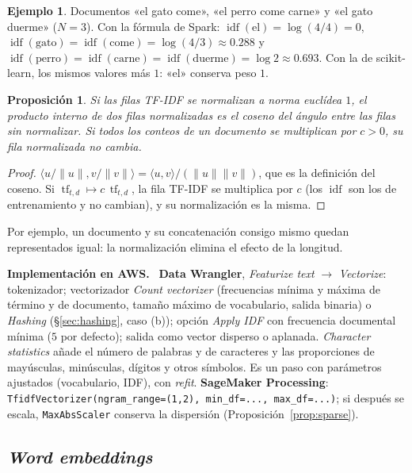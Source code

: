 \documentclass[11pt,a4paper]{article}
\theoremstyle{plain}
\newtheorem{proposicion}[teorema]{Proposición}
\theoremstyle{definition}
\newtheorem{ejemplo}[teorema]{Ejemplo}
\theoremstyle{remark}
\newcommand{\idf}{\operatorname{idf}}
\newcommand{\tf}{\operatorname{tf}}
\newcommand{\1}{\mathbf{1}}
\newenvironment{aws}{\par\medskip\sloppy\noindent\textbf{Implementación en AWS.}\ }{\par\medskip}
\begin{document}
\begin{ejemplo}
Documentos «el gato come», «el perro come carne» y «el gato duerme»
($N=3$). Con la fórmula de Spark: $\idf(\text{el})=\log(4/4)=0$,
$\idf(\text{gato})=\idf(\text{come})=\log(4/3)\approx0.288$ y
$\idf(\text{perro})=\idf(\text{carne})=\idf(\text{duerme})=\log2\approx0.693$.
Con la de scikit-learn, los mismos valores más $1$: «el» conserva peso $1$.
\end{ejemplo}

\begin{proposicion}\label{prop:coseno}
Si las filas TF-IDF se normalizan a norma euclídea $1$, el producto
interno de dos filas normalizadas es el coseno del ángulo entre las filas
sin normalizar. Si todos los conteos de un documento se multiplican por
$c>0$, su fila normalizada no cambia.
\end{proposicion}

\begin{proof}
$\langle u/\|u\|,v/\|v\|\rangle=\langle u,v\rangle/(\|u\|\|v\|)$, que es
la definición del coseno. Si $\tf_{t,d}\mapsto c\,\tf_{t,d}$, la fila
TF-IDF se multiplica por $c$ (los $\idf$ son los de entrenamiento y no
cambian), y su normalización es la misma.
\end{proof}

Por ejemplo, un documento y su concatenación consigo mismo quedan
representados igual: la normalización elimina el efecto de la longitud.

\begin{aws}
\textbf{Data Wrangler}, \emph{Featurize text} $\to$ \emph{Vectorize}:
tokenizador; vectorizador \emph{Count vectorizer} (frecuencias mínima y
máxima de término y de documento, tamaño máximo de vocabulario, salida
binaria) o \emph{Hashing} (\S\ref{sec:hashing}, caso (b)); opción
\emph{Apply IDF} con frecuencia documental mínima ($5$ por defecto); salida
como vector disperso o aplanada. \emph{Character statistics} añade el
número de palabras y de caracteres y las proporciones de mayúsculas,
minúsculas, dígitos y otros símbolos. Es un paso con parámetros
ajustados (vocabulario, IDF), con \emph{refit}. \textbf{SageMaker
Processing}: \texttt{TfidfVectorizer(ngram\_range=(1,2), min\_df=...,
max\_df=...)}; si después se escala, \texttt{MaxAbsScaler} conserva la
dispersión (Proposición~\ref{prop:sparse}).
\end{aws}

\subsection{\emph{Word embeddings}}
\end{document}

